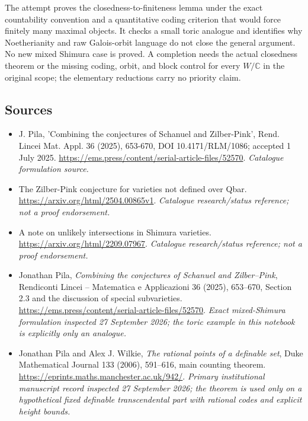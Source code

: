 \documentclass[11pt,a4paper]{article}
\numberwithin{equation}{section}
\newcommand{\C}{\mathbb{C}}
\begin{document}
The attempt proves the closedness-to-finiteness lemma under the exact
countability convention and a quantitative coding criterion that would
force finitely many maximal objects. It checks a small toric analogue and
identifies why Noetherianity and raw Galois-orbit language do not close the
general argument. No new mixed Shimura case is proved. A completion needs
the actual closedness theorem or the missing coding, orbit, and block
control for every $W/\C$ in the original scope; the elementary reductions
carry no priority claim.
\subsection{Sources}
\begin{itemize}\raggedright
\item[\textnormal{[S1]}]\hypertarget{source:82:1}{} J. Pila, 'Combining the conjectures of Schanuel and Zilber-Pink', Rend. Lincei Mat. Appl. 36 (2025), 653-670, DOI 10.4171/RLM/1086; accepted 1 July 2025.
\url{https://ems.press/content/serial-article-files/52570}.
{\small\textit{Catalogue formulation source.}}
\item[\textnormal{[S2]}]\hypertarget{source:82:2}{} The Zilber-Pink conjecture for varieties not defined over Qbar.
\url{https://arxiv.org/html/2504.00865v1}.
{\small\textit{Catalogue research/status reference; not a proof endorsement.}}
\item[\textnormal{[S3]}]\hypertarget{source:82:3}{} A note on unlikely intersections in Shimura varieties.
\url{https://arxiv.org/html/2209.07967}.
{\small\textit{Catalogue research/status reference; not a proof endorsement.}}
\item[\textnormal{[E1]}]\hypertarget{extra:82:1}{} Jonathan Pila,
\emph{Combining the conjectures of Schanuel and Zilber--Pink},
Rendiconti Lincei -- Matematica e Applicazioni 36 (2025), 653--670,
Section 2.3 and the discussion of special subvarieties.
\url{https://ems.press/content/serial-article-files/52570}.
{\small\textit{Exact mixed-Shimura formulation inspected 27 September 2026;
the toric example in this notebook is explicitly only an analogue.}}
\item[\textnormal{[E2]}]\hypertarget{extra:82:2}{} Jonathan Pila and
Alex J. Wilkie, \emph{The rational points of a definable set},
Duke Mathematical Journal 133 (2006), 591--616, main counting theorem.
\url{https://eprints.maths.manchester.ac.uk/942/}.
{\small\textit{Primary institutional manuscript record inspected
27 September 2026; the theorem is used only on a hypothetical fixed
definable transcendental part with rational codes and explicit height bounds.}}
\end{itemize}
\end{document}
